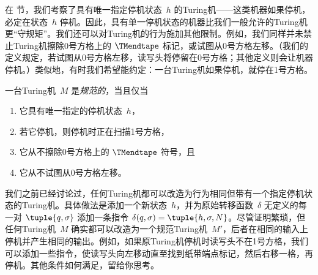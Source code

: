 \documentclass[../../../include/open-logic-section]{subfiles}
\begin{document}

\begin{explain}
在  节，我们考察了具有唯一指定停机状态~$h$ 的Turing机——这类机器如果停机，必定在状态~$h$ 停机。因此，具有单一停机状态的机器比我们一般允许的Turing机更“守规矩”。我们还可以对Turing机的行为施加其他限制。例如，我们同样并未禁止Turing机擦除0号方格上的 $\TMendtape$ 标记，或试图从0号方格左移。（我们的定义规定，若试图从0号方格左移，读写头将停留在0号方格；其他定义则会让机器停机。）类似地，有时我们希望能约定：一台Turing机如果停机，就停在1号方格。
\end{explain}

\begin{defn}
一台Turing机~$M$ 是\emph{规范的}，当且仅当
\begin{enumerate}
    \item 它具有唯一指定的停机状态~$h$，
    \item 若它停机，则停机时正在扫描1号方格，
    \item 它从不擦除0号方格上的 $\TMendtape$ 符号，且
    \item 它从不试图从0号方格左移。
\end{enumerate}
\end{defn}

\begin{explain}
我们之前已经讨论过，任何Turing机都可以改造为行为相同但带有一个指定停机状态的Turing机。具体做法是添加一个新状态~$h$，并为原始转移函数~$\delta$ 无定义的每一对 $\tuple{q,\sigma}$ 添加一条指令 $\delta(q, \sigma) = \tuple{h, \sigma, N}$。尽管证明繁琐，但任何Turing机~$M$ 确实都可以改造为一个规范Turing机~$M'$，后者在相同的输入上停机并产生相同的输出。例如，如果原Turing机停机时读写头不在1号方格，我们可以添加一些指令，使读写头向左移动直至找到纸带端点标记，然后右移一格，再停机。其他条件如何满足，留给你思考。
\end{explain}
\end{document}
